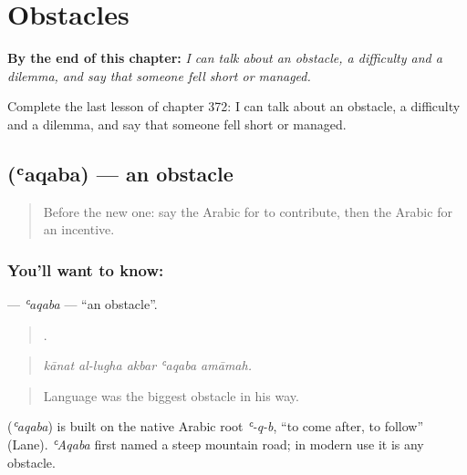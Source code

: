 
\chapter{Obstacles}
\label{ch:ar-obstacles}

\begin{chapteropening}
\textbf{By the end of this chapter:} \emph{I can talk about an obstacle, a difficulty and a dilemma, and say that someone fell short or managed.}

Complete the last lesson of chapter 372: I can talk about an obstacle, a difficulty and a dilemma, and say that someone fell short or managed.
\end{chapteropening}

\section[\texorpdfstring{\ar{عقبة} (ʿaqaba)}{عقبة (ʿaqaba)}]{ (ʿaqaba) — an obstacle}

\label{lesson:AR-C372-aqaba}



\begin{quote}
Before the new one: say the Arabic for to contribute, then the Arabic for an incentive.
\end{quote}

\subsection*{You'll want to know: }
\textbf{} — \emph{ʿaqaba} — \textquotedblleft{}an obstacle\textquotedblright{}.

\begin{quote}
    .
\end{quote}

\begin{quote}
\emph{kānat al-lugha akbar ʿaqaba amāmah.}
\end{quote}

\begin{quote}
Language was the biggest obstacle in his way.
\end{quote}

\begin{cousinweb}
\textbf{} (\emph{ʿaqaba}) is built on the native Arabic root \emph{ʿ-q-b}, \textquotedblleft{}to come after, to follow\textquotedblright{} (Lane). \emph{ʿAqaba} first named a steep mountain road; in modern use it is any obstacle.
\end{cousinweb}

